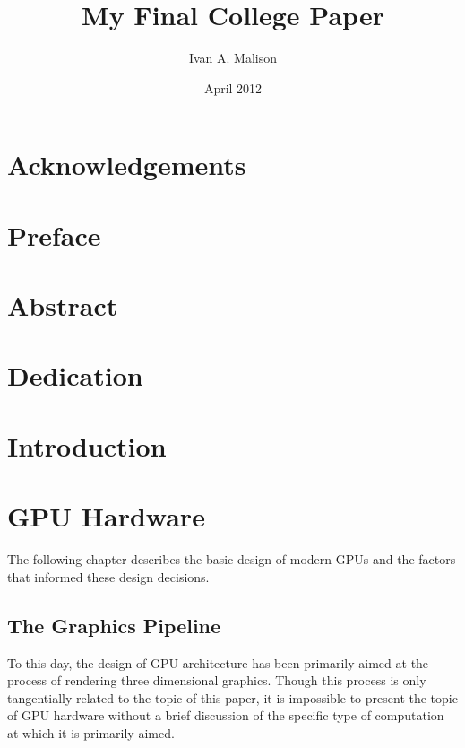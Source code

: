 \documentclass[12pt,twoside]{reedthesis}
\title{My Final College Paper}
\author{Ivan A. Malison}
\date{April 2012}
\begin{document}
  \maketitle
  \frontmatter 
  \pagestyle{empty}

  \chapter*{Acknowledgements}

    \chapter*{Preface}

    \tableofcontents

    \chapter*{Abstract}
	
	\chapter*{Dedication}

  \mainmatter 
  \pagestyle{fancyplain}

    \chapter*{Introduction}

\chapter{GPU Hardware}

The following chapter describes the basic design of modern GPUs and the factors that informed these design decisions.

\section{The Graphics Pipeline}

To this day, the design of GPU architecture has been primarily aimed at the process of rendering three dimensional graphics. Though this process is only tangentially related to the topic of this paper, it is impossible to present the topic of GPU hardware without a brief discussion of the specific type of computation at which it is primarily aimed.
\end{document}
